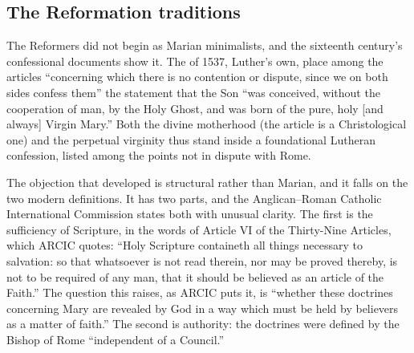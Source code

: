 \subsection*{The Reformation traditions}

The Reformers did not begin as Marian minimalists, and the sixteenth
century's confessional documents show it. The  of
1537, Luther's own, place among the articles ``concerning which there is
no contention or dispute, since we on both sides confess them'' the
statement that the Son ``was conceived, without the cooperation of man,
by the Holy Ghost, and was born of the pure, holy [and always] Virgin
Mary.'' Both the
divine motherhood (the article is a Christological one) and the perpetual
virginity thus stand inside a foundational Lutheran confession, listed
among the points not in dispute with Rome.

The objection that developed is structural rather than Marian, and it
falls on the two modern definitions. It has two parts, and the
Anglican--Roman Catholic International Commission states both with
unusual clarity. The first is the sufficiency of Scripture, in the words
of Article VI of the Thirty-Nine Articles, which ARCIC quotes: ``Holy
Scripture containeth all things necessary to salvation: so that
whatsoever is not read therein, nor may be proved thereby, is not to be
required of any man, that it should be believed as an article of the
Faith.'' The question this raises, as ARCIC puts it, is ``whether these
doctrines concerning Mary are revealed by God in a way which must be held
by believers as a matter of faith.'' The second is authority: the
doctrines were defined by the Bishop of Rome ``independent of a
Council.''

